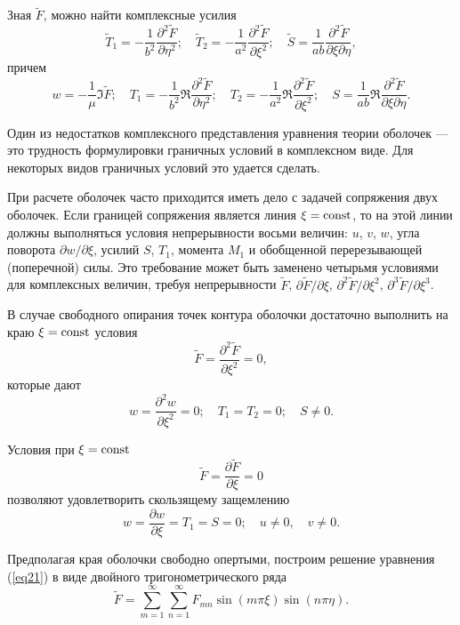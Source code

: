 \documentclass[press]{vestnik}
\begin{document}
Зная $\tilde{{F}}$, можно найти комплексные усилия
\[
\tilde{{T}}_{1} =-\frac{1}{b^{2}}\frac{\partial^{2}\tilde{{F}}}{\partial 
\eta^{2}};
\quad
\tilde{{T}}_{2} =-\frac{1}{a^{2}}\frac{\partial^{2}\tilde{{F}}}{\partial 
\xi^{2}};
\quad
\tilde{{S}}=\frac{1}{ab}\frac{\partial^{2}\tilde{{F}}}{\partial \xi 
\partial \eta },
\]
причем 
\[
w=-\frac{1}{\mu }\Im\tilde{{F}};
\quad
T_{1}=-\frac{1}{b^{2}}\Re\frac{\partial^{2}\tilde{{F}}}{\partial \eta^{2}}; 
\quad
T_{2} =-\frac{1}{a^{2}}\Re\frac{\partial^{2}\tilde{{F}}}{\partial \xi^{2}};
\quad
S=\frac{1}{ab}\Re\frac{\partial^{2}\tilde{{F}}}{\partial \xi \partial \eta }.
\]

Один из недостатков комплексного представления уравнения теории оболочек --- 
это трудность формулировки граничных условий в комплексном виде. Для 
некоторых видов граничных условий это удается сделать.

При расчете оболочек часто приходится иметь дело с задачей сопряжения двух 
оболочек. Если границей сопряжения является линия $\xi =\mathrm{const}$, то на этой 
линии должны выполняться условия непрерывности восьми величин: $u$, $v$, $w$, угла 
поворота $\partial w/\partial \xi$, усилий $S$, $T_{1} $, момента 
$M_{1} $ и обобщенной перерезывающей (поперечной) силы. Это требование может 
быть заменено четырьмя условиями для комплексных величин, требуя 
непрерывности $\tilde{{F}}$, $\partial \tilde{F}/\partial \xi$, $\partial^{2}\tilde{F}/\partial \xi^{2}$, $\partial^{3}\tilde{F}/\partial \xi^{3}$.

В случае свободного опирания точек контура оболочки достаточно выполнить на 
краю $\xi =\mathrm{const}$ условия
\begin{equation}
\label{eq22}
\tilde{{F}}=\frac{\partial^{2}\tilde{{F}}}{\partial \xi^{2}}=0,
\end{equation}
которые дают
\[
w=\frac{\partial^{2}w}{\partial \xi^{2}}=0;
\quad
T_{1} =T_{2} =0;
\quad
S\ne 0.
\]

Условия при $\xi =\mathrm{const}$
\begin{equation}
\label{eq23}
\tilde{{F}}=\frac{\partial \tilde{{F}}}{\partial \xi }=0
\end{equation}
позволяют удовлетворить скользящему защемлению
\[
w=\frac{\partial w}{\partial \xi }=T_{1} =S=0;
\quad
u\ne 0,
\quad
v\ne 0.
\]

Предполагая края оболочки свободно опертыми, построим решение уравнения 
(\ref{eq21}) в виде двойного тригонометрического ряда~\cite{B21}
\begin{equation}
\label{eq24}
\tilde{{F}}=\sum\limits_{m=1}^\infty {\sum\limits_{n=1}^\infty {F_{mn} } } 
\sin \left( {m\pi \xi } \right)\sin \left( {n\pi \eta } \right).
\end{equation}
\end{document}
